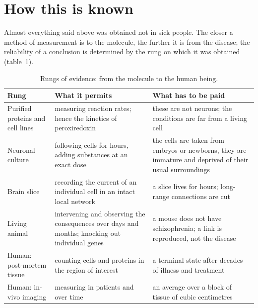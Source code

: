 \section{How this is known}
Almost everything said above was obtained not in sick people. The closer a method of measurement is to the molecule, the further it is from the disease; the reliability of a conclusion is determined by the rung on which it was obtained (table~1).
\begin{table}[t]\small\centering
\begin{tabular}{@{}>{\raggedright\arraybackslash}p{}>{\raggedright\arraybackslash}p{}>{\raggedright\arraybackslash}p{}@{}}
\toprule
\textsf{\textbf{Rung}} & \textsf{\textbf{What it permits}} & \textsf{\textbf{What has to be paid}}\\
\midrule
Purified proteins and cell lines & measuring reaction rates; hence the kinetics of peroxiredoxin & these are not neurons; the conditions are far from a living cell\\
\addlinespace
Neuronal culture & following cells for hours, adding substances at an exact dose & the cells are taken from embryos or newborns, they are immature and deprived of their usual surroundings\\
\addlinespace
Brain slice & recording the current of an individual cell in an intact local network & a slice lives for hours; long-range connections are cut\\
\addlinespace
Living animal & intervening and observing the consequences over days and months; knocking out individual genes & a mouse does not have schizophrenia; a link is reproduced, not the disease\\
\addlinespace
Human: post-mortem tissue & counting cells and proteins in the region of interest & a terminal state after decades of illness and treatment\\
\addlinespace
Human: in-vivo imaging & measuring in patients and over time & an average over a block of tissue of cubic centimetres\\
\bottomrule
\end{tabular}
\caption{Rungs of evidence: from the molecule to the human being.}
\end{table}
\facts
